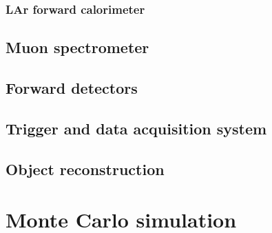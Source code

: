 \subsubsection{LAr forward calorimeter}

\subsection{Muon spectrometer}

\subsection{Forward detectors}

\subsection{Trigger and data acquisition system}

\subsection{Object reconstruction}


\section{Monte Carlo simulation}

